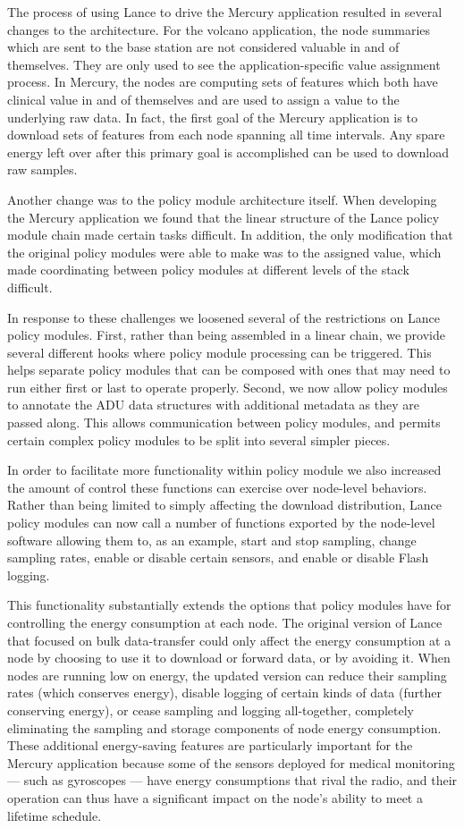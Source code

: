 The process of using Lance to drive the Mercury application resulted in
several changes to the architecture. For the volcano application, the node
summaries which are sent to the base station are not considered valuable in
and of themselves. They are only used to see the application-specific value
assignment process. In Mercury, the nodes are computing sets of features
which both have clinical value in and of themselves and are used to assign a
value to the underlying raw data. In fact, the first goal of the Mercury
application is to download sets of features from each node spanning all time
intervals. Any spare energy left over after this primary goal is accomplished
can be used to download raw samples.

Another change was to the policy module architecture itself. When developing
the Mercury application we found that the linear structure of the Lance
policy module chain made certain tasks difficult. In addition, the only
modification that the original policy modules were able to make was to the
assigned value, which made coordinating between policy modules at different
levels of the stack difficult.

In response to these challenges we loosened several of the restrictions on
Lance policy modules. First, rather than being assembled in a linear chain,
we provide several different hooks where policy module processing can be
triggered. This helps separate policy modules that can be composed with ones
that may need to run either first or last to operate properly. Second, we now
allow policy modules to annotate the ADU data structures with additional
metadata as they are passed along. This allows communication between policy
modules, and permits certain complex policy modules to be split into several
simpler pieces.

In order to facilitate more functionality within policy module we also
increased the amount of control these functions can exercise over node-level
behaviors. Rather than being limited to simply affecting the download
distribution, Lance policy modules can now call a number of functions
exported by the node-level software allowing them to, as an example, start
and stop sampling, change sampling rates, enable or disable certain sensors,
and enable or disable Flash logging.

This functionality substantially extends the options that policy modules have
for controlling the energy consumption at each node. The original version of
Lance that focused on bulk data-transfer could only affect the energy
consumption at a node by choosing to use it to download or forward data, or
by avoiding it. When nodes are running low on energy, the updated version can
reduce their sampling rates (which conserves energy), disable logging of
certain kinds of data (further conserving energy), or cease sampling and
logging all-together, completely eliminating the sampling and storage
components of node energy consumption. These additional energy-saving
features are particularly important for the Mercury application because some
of the sensors deployed for medical monitoring --- such as gyroscopes ---
have energy consumptions that rival the radio, and their operation can thus
have a significant impact on the node's ability to meet a lifetime schedule.

